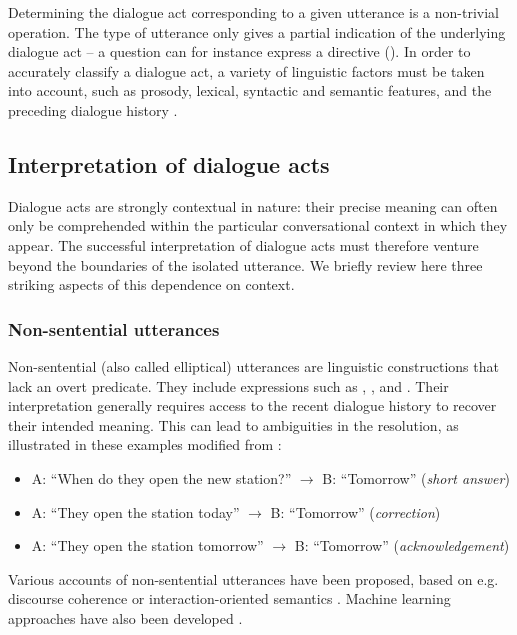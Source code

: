 Determining the dialogue act corresponding to a given utterance is a non-trivial operation. The type of utterance only gives a partial indication of the underlying dialogue act -- a question can for instance express a directive ().  In order to accurately classify a dialogue act, a variety of linguistic factors must be taken into account, such as prosody, lexical, syntactic and semantic features, and the preceding dialogue history \citep{jurafsky1998,Shriberg1998,stolcke2000,Keizer2007}.

\subsection{Interpretation of dialogue acts} 

Dialogue acts are strongly contextual in nature: their precise meaning can often only be comprehended within the particular conversational context in which they appear. The successful interpretation  of dialogue acts must therefore venture beyond the boundaries of the isolated utterance. We briefly review here three striking aspects of this dependence on context.

\subsubsection*{Non-sentential utterances}
\label{non-sentential utterance}
Non-sentential (also called elliptical) utterances are linguistic constructions that lack an overt predicate.  They include expressions such as  , ,  and . Their interpretation generally requires access to the recent dialogue history to recover their intended meaning. This can lead to ambiguities in the resolution, as illustrated in these examples modified from \cite{Fernandez:2007}: \begin{itemize}
\item A: ``When do they open the new station?''  $\rightarrow$ B: ``Tomorrow'' (\textit{short answer})
\item A: ``They open the station today''  $\rightarrow$ B: ``Tomorrow'' (\textit{correction})
\item A: ``They open the station tomorrow''  $\rightarrow$ B: ``Tomorrow'' (\textit{acknowledgement})
\end{itemize}

Various accounts of non-sentential utterances have been proposed, based on e.g. discourse coherence \citep{Schlangen03theinterpretation} or interaction-oriented semantics \citep{fernandez2006non,Ginzburg2012}. Machine learning approaches have also been developed \citep{Schlangen:2005,Fernandez:2007}. 


